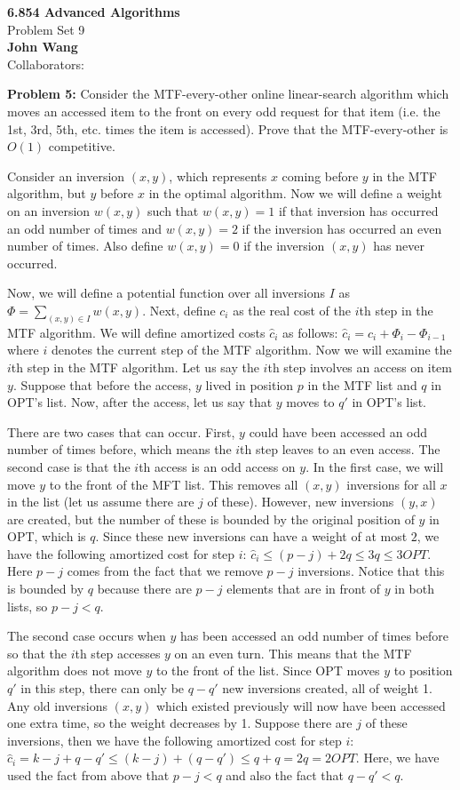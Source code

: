 \documentclass[psamsfonts]{amsart}
\newenvironment{sol}{\vspace{0.25cm}{\large \bfseries Solution:}}{\qedsymbol}
\newenvironment{prob}[1]{\begin{framed}{\large \bfseries Problem #1:}}{\end{framed}}
\newcommand{\makenewtitle}{
    \begin{center}
    {\huge \bfseries 6.854 Advanced Algorithms} \\
    Problem Set 9\\
    \vspace{0.25cm}
    {\bfseries John Wang} \\
    Collaborators:  
    \end{center}
    \vspace{0.5cm}
}
\begin{document}
\newpage
\makenewtitle

\begin{prob}{5}
Consider the MTF-every-other online linear-search algorithm which moves an accessed item to the front on every odd request for that item (i.e. the 1st, 3rd, 5th, etc. times the item is accessed). Prove that the MTF-every-other is $O(1)$ competitive.
\end{prob}
\begin{sol}
Consider an inversion $(x,y)$, which represents $x$ coming before $y$ in the MTF algorithm, but $y$ before $x$ in the optimal algorithm. Now we will define a weight on an inversion $w(x,y)$ such that $w(x,y) = 1$ if that inversion has occurred an odd number of times and $w(x,y) = 2$ if the inversion has occurred an even number of times. Also define $w(x,y) = 0$ if the inversion $(x,y)$ has never occurred. 

Now, we will define a potential function over all inversions $I$ as $\Phi = \sum_{(x,y) \in I} w(x,y)$. Next, define $c_i$ as the real cost of the $i$th step in the MTF algorithm. We will define amortized costs $\hat{c}_i$ as follows: $\hat{c}_i = c_i + \Phi_i - \Phi_{i-1}$ where $i$ denotes the current step of the MTF algorithm. Now we will examine the $i$th step in the MTF algorithm. Let us say the $i$th step involves an access on item $y$. Suppose that before the access, $y$ lived in position $p$ in the MTF list and $q$ in OPT's list. Now, after the access, let us say that $y$ moves to $q'$ in OPT's list. 

There are two cases that can occur. First, $y$ could have been accessed an odd number of times before, which means the $i$th step leaves to an even access. The second case is that the $i$th access is an odd access on $y$. In the first case, we will move $y$ to the front of the MFT list. This removes all $(x,y)$ inversions for all $x$ in the list (let us assume there are $j$ of these). However, new inversions $(y,x)$ are created, but the number of these is bounded by the original position of $y$ in OPT, which is $q$. Since these new inversions can have a weight of at most $2$, we have the following amortized cost for step $i$: $\hat{c}_i \leq (p-j) + 2q \leq 3q \leq 3 OPT$. Here $p-j$ comes from the fact that we remove $p-j$ inversions. Notice that this is bounded by $q$ because there are $p-j$ elements that are in front of $y$ in both lists, so $p-j < q$.

The second case occurs when $y$ has been accessed an odd number of times before so that the $i$th step accesses $y$ on an even turn. This means that the MTF algorithm does not move $y$ to the front of the list. Since OPT moves $y$ to position $q'$ in this step, there can only be $q - q'$ new inversions created, all of weight 1. Any old inversions $(x,y)$ which existed previously will now have been accessed one extra time, so the weight decreases by 1. Suppose there are $j$ of these inversions, then we have the following amortized cost for step $i$: $\hat{c}_i = k - j + q - q' \leq (k-j) + (q-q') \leq q + q = 2q = 2OPT$. Here, we have used the fact from above that $p-j < q$ and also the fact that $q-q' < q$.  


\end{sol}
\end{document}
